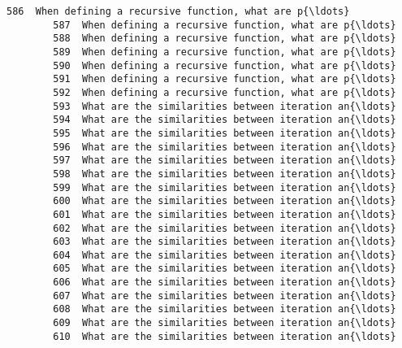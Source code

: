 \documentclass[11pt]{article}
\begin{document}
\begin{Verbatim}[commandchars=\\\{\}]
        586  When defining a recursive function, what are p{\ldots}   
        587  When defining a recursive function, what are p{\ldots}   
        588  When defining a recursive function, what are p{\ldots}   
        589  When defining a recursive function, what are p{\ldots}   
        590  When defining a recursive function, what are p{\ldots}   
        591  When defining a recursive function, what are p{\ldots}   
        592  When defining a recursive function, what are p{\ldots}   
        593  What are the similarities between iteration an{\ldots}   
        594  What are the similarities between iteration an{\ldots}   
        595  What are the similarities between iteration an{\ldots}   
        596  What are the similarities between iteration an{\ldots}   
        597  What are the similarities between iteration an{\ldots}   
        598  What are the similarities between iteration an{\ldots}   
        599  What are the similarities between iteration an{\ldots}   
        600  What are the similarities between iteration an{\ldots}   
        601  What are the similarities between iteration an{\ldots}   
        602  What are the similarities between iteration an{\ldots}   
        603  What are the similarities between iteration an{\ldots}   
        604  What are the similarities between iteration an{\ldots}   
        605  What are the similarities between iteration an{\ldots}   
        606  What are the similarities between iteration an{\ldots}   
        607  What are the similarities between iteration an{\ldots}   
        608  What are the similarities between iteration an{\ldots}   
        609  What are the similarities between iteration an{\ldots}   
        610  What are the similarities between iteration an{\ldots}   
        

\end{Verbatim}
\end{document}
